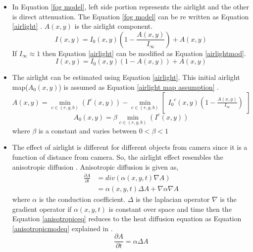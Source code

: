 \begin{itemize}
\item In Equation \ref{fog model}, left side portion represents the airlight and the other is direct attenuation. The Equation \ref{fog model} can be re written as Equation \ref{airlight} \cite{fog removal}. $A(x,y)$ is the airlight component. 
\begin{equation}\label{airlight}
I(x,y)=I_0(x,y) (1-\frac{A(x,y)}{I_\infty})+A(x,y)
\end{equation}
If $I_\infty \approx 1$ then Equation \ref{airlight} can be modified as Equation \ref{airlightmod}.
\begin{equation}\label{airlightmod}
I(x,y)=I_0(x,y) (1-A(x,y))+A(x,y)
\end{equation}
\item The airlight can be estimated using Equation \ref{airlight}. This initial airlight map($A_0(x,y)$) is assumed as Equation \ref{airlight map assumption} \cite{fog removal}.
\begin{equation}\label{airlightest}
A(x,y) = \min_{c \in (r,g,b)} (I^c(x,y))-\min_{c \in (r,g,b)}\begin{bmatrix}
{I_0}^c(x,y)(1-\frac{A(x,y)}{I_\infty})
\end{bmatrix}
\end{equation}
\begin{equation}\label{airlight map assumption}
A_0(x,y)=\beta \min_{c\in (r,g,b)}(I^c(x,y))
\end{equation} 
where $\beta$ is a constant and varies between $0<\beta<1$
\item The effect of airlight is different for different objects from camera since it is a function of distance from camera. So, the airlight effect resembles the anisotropic diffusion \cite{fog removal} \cite{anisotropic}.
Anisotropic diffusion is given as,
\begin{align}\label{anisotropiceq}
\frac{\partial A}{\partial t} &= div(\alpha(x,y,t)\nabla A)\\
& = \alpha(x,y,t)\Delta A + \nabla \alpha \nabla A
\end{align}  
where $\alpha$ is the conduction coefficient.
$\Delta$ is the laplacian operator
$\nabla$ is the gradient operator
if $\alpha(x,y,t)$ is constant over space and time then the Equation \ref{anisotropiceq} reduces to the heat diffusion equation as Equation \ref{anisotropicmodeq} explained in \cite{fog removal}.
\begin{equation}\label{anisotropicmodeq}
\frac{\partial A}{\partial t} = \alpha \Delta A
\end{equation}

\end{itemize}
